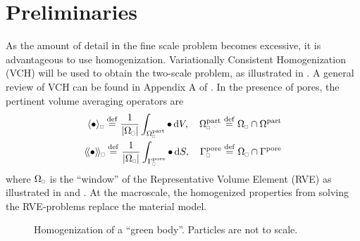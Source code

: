\documentclass[MikaelDissertation.tex]{subfiles}
\begin{document}
\section{Preliminaries}

As the amount of detail in the fine scale problem becomes excessive, it is advantageous to use homogenization.
Variationally Consistent Homogenization (VCH) will be used to obtain the two-scale problem, as illustrated in .
A general review of VCH can be found in Appendix A of .
In the presence of pores, the pertinent volume averaging operators are
\begin{align}
 \homgen{\bullet} \defeq \frac{1}{\volume} \int_{\Omega_\rve^\particle} \bullet \dif V,\quad \Omega_\rve^\particle \defeq \Omega_\rve \cap \Omega^\particle
\\
 \shomgen{\bullet} \defeq \frac{1}{\volume} \int_{\Gamma^\pore_\rve} \bullet \dif S,\quad \Gamma^\pore_\rve \defeq \Omega_\rve \cap \Gamma^\pore
\end{align}
where $\Omega_\rve$ is the ``window'' of the Representative Volume Element (RVE) as illustrated in  and .
At the macroscale, the homogenized properties from solving the RVE-problems replace the material model.

\begin{figure}[htpb!]
\centering
{}
\caption{Homogenization of a ``green body''. Particles are not to scale.}
\label{fig:homogenization}
\end{figure}
\end{document}

